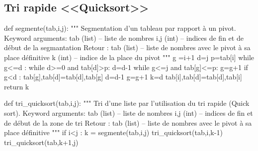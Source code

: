 \documentclass[10pt]{article}
\begin{document}
\subsection{Tri rapide <<Quicksort>>}
\begin{py}
\begin{python}
def segmente(tab,i,j):
    """
    Segmentation d'un tableau par rapport à un pivot.
    Keyword arguments: 
    tab (list) -- liste de nombres
    i,j (int) -- indices de fin et de début de la segmantation
    Retour :    
    tab (list) -- liste de nombres avec le pivot à sa place définitive
    k (int) -- indice de la place du pivot
    """
    g =i+1
    d=j
    p=tab[i]
    while g<=d :
        while d>=0 and tab[d]>p:
            d=d-1
        while g<=j and tab[g]<=p:
            g=g+1
        if g<d :
            tab[g],tab[d]=tab[d],tab[g]
            d=d-1
            g=g+1
    k=d
    tab[i],tab[d]=tab[d],tab[i]
    return k
\end{python}

\begin{python}
def tri_quicksort(tab,i,j):
    """
    Tri d'une liste par l'utilisation du tri rapide (Quick sort).
    Keyword arguments: 
    tab (list) -- liste de nombres
    i,j (int) -- indices de fin et de début de la zone de tri
    Retour :    
    tab (list) -- liste de nombres avec le pivot à sa place définitive
    """
    if i<j :
        k = segmente(tab,i,j)
        tri_quicksort(tab,i,k-1)
        tri_quicksort(tab,k+1,j)
\end{python}
\end{py}
\end{document}
